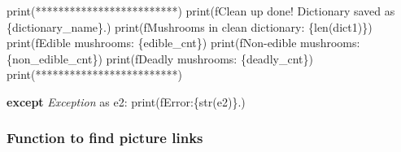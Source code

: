 \documentclass[
]{article}
\newenvironment{Shaded}{\begin{snugshade}}{\end{snugshade}}
\newcommand{\BuiltInTok}[1]{#1}
\newcommand{\ControlFlowTok}[1]{\textcolor[rgb]{0.13,0.29,0.53}{\textbf{#1}}}
\newcommand{\ImportTok}[1]{#1}
\newcommand{\NormalTok}[1]{#1}
\newcommand{\PreprocessorTok}[1]{\textcolor[rgb]{0.56,0.35,0.01}{\textit{#1}}}
\newcommand{\SpecialCharTok}[1]{\textcolor[rgb]{0.00,0.00,0.00}{#1}}
\newcommand{\SpecialStringTok}[1]{\textcolor[rgb]{0.31,0.60,0.02}{#1}}
\newcommand{\StringTok}[1]{\textcolor[rgb]{0.31,0.60,0.02}{#1}}
\begin{document}
\begin{Shaded}
\begin{Highlighting}[]
        \BuiltInTok{print}\NormalTok{(}\StringTok{\textquotesingle{}*************************\textquotesingle{}}\NormalTok{)}
        \BuiltInTok{print}\NormalTok{(}\SpecialStringTok{f\textquotesingle{}Clean up done! Dictionary saved as }\SpecialCharTok{\{}\NormalTok{dictionary\_name}\SpecialCharTok{\}}\SpecialStringTok{.\textquotesingle{}}\NormalTok{)}
        \BuiltInTok{print}\NormalTok{(}\SpecialStringTok{f\textquotesingle{}Mushrooms in clean dictionary: }\SpecialCharTok{\{}\BuiltInTok{len}\NormalTok{(dict1)}\SpecialCharTok{\}}\SpecialStringTok{\textquotesingle{}}\NormalTok{)}
        \BuiltInTok{print}\NormalTok{(}\SpecialStringTok{f\textquotesingle{}Edible mushrooms: }\SpecialCharTok{\{}\NormalTok{edible\_cnt}\SpecialCharTok{\}}\SpecialStringTok{\textquotesingle{}}\NormalTok{)}
        \BuiltInTok{print}\NormalTok{(}\SpecialStringTok{f\textquotesingle{}Non{-}edible mushrooms: }\SpecialCharTok{\{}\NormalTok{non\_edible\_cnt}\SpecialCharTok{\}}\SpecialStringTok{\textquotesingle{}}\NormalTok{)}
        \BuiltInTok{print}\NormalTok{(}\SpecialStringTok{f\textquotesingle{}Deadly mushrooms: }\SpecialCharTok{\{}\NormalTok{deadly\_cnt}\SpecialCharTok{\}}\SpecialStringTok{\textquotesingle{}}\NormalTok{)}
        \BuiltInTok{print}\NormalTok{(}\StringTok{\textquotesingle{}*************************\textquotesingle{}}\NormalTok{)}

    \ControlFlowTok{except} \PreprocessorTok{Exception} \ImportTok{as}\NormalTok{ e2:}
        \BuiltInTok{print}\NormalTok{(}\SpecialStringTok{f\textquotesingle{}Error:}\SpecialCharTok{\{}\BuiltInTok{str}\NormalTok{(e2)}\SpecialCharTok{\}}\SpecialStringTok{.\textquotesingle{}}\NormalTok{)}
\end{Highlighting}
\end{Shaded}

\hypertarget{function-to-find-picture-links}{%
\subsubsection{Function to find picture
links}\label{function-to-find-picture-links}}
\end{document}
